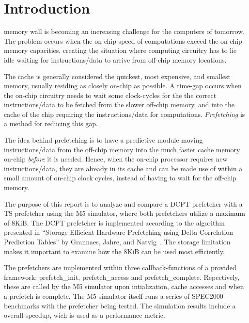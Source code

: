 \section{Introduction}

 memory wall is becoming an increasing challenge for the
computers of tomorrow. The problem occurs when the on-chip speed of computations
exceed the on-chip memory capacities, creating the situation where computing
circuitry has to lie idle waiting for instructions/data to arrive from off-chip
memory locations. 

The cache is generally considered the quickest, most expensive, and smallest memory, usually residing as closely on-chip as possible. A time-gap occurs when the on-chip circuitry needs to wait some clock-cycles for the the correct instructions/data to be fetched from the slower off-chip memory, and into the cache of the chip requiring the instructions/data for computations. \emph{Prefetching} is a method for reducing this gap.

The idea behind prefetching is to have a predictive module moving instructions/data from the off-chip memory into the much faster cache memory on-chip \emph{before} it is needed. Hence, when the on-chip processor requires new instructions/data, they are already in its cache and can be made use of within a small amount of on-chip clock cycles, instead of having to wait for the off-chip memory.

The purpose of this report is to analyze and compare a DCPT prefetcher with a TS
prefetcher using the M5 simulator, where both prefetchers utilize a maximum of
8KiB. The DCPT prefetcher is implemented according to the algorithm presented in
``Storage Efficient Hardware Prefetching using Delta Correlation Prediction
Tables'' by Grannaes, Jahre, and Natvig~\cite{dcpt}. The storage limitation
makes it important to examine how the 8KiB can be used most efficiently.

The prefetchers are implemented within three callback-functions of a provided framework: prefetch\_init, prefetch\_access and prefetch\_complete. Repectively, these are called by the M5 simulator upon intialization, cache accesses and when a prefetch is complete. The M5 simulator itself runs a series of SPEC2000 benchmarks with the prefetcher being tested. The simulation results include a overall speedup, wich is used as a performance metric.